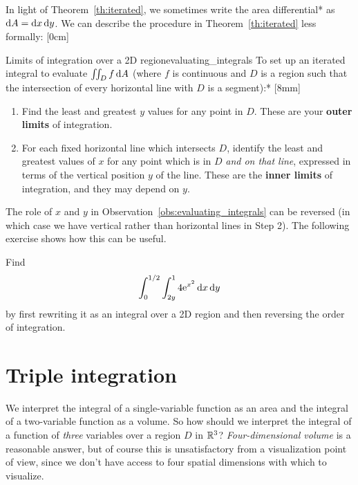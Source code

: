 \documentclass{watsonbook}
\begin{document}
In light of Theorem~\ref{th:iterated}, we sometimes write the area
differential* as $\mathrm{d} A = \mathrm{d} x \, \mathrm{d} y$. We can describe the procedure
in Theorem~\ref{th:iterated} less formally: [0cm]
\begin{obs}{Limits of integration over a 2D
    region}{evaluating_integrals}
  To set up an iterated integral to evaluate $\iint_D f \, {\mathrm{d}}A$
  (where $f$ is continuous and $D$ is a region such that the
  intersection of every horizontal line with $D$ is a segment):*
  [8mm] 
  \begin{enumerate}[leftmargin=12pt, itemsep = 6pt, topsep = 5pt]
  \item Find the least and greatest $y$ values for any point in
    $D$. These are your \textbf{outer limits} of integration. 
  \item For each fixed horizontal line which intersects $D$, identify
    the least and greatest values of $x$ for any point which is in $D$
    \textit{and on that line}, expressed in terms of the vertical
    position $y$ of the line. These are the \textbf{inner limits} of
    integration, and they may depend on $y$.
  \end{enumerate}
\end{obs}

The role of $x$ and $y$ in Observation~\ref{obs:evaluating_integrals}
can be reversed (in which case we have vertical rather than horizontal
lines in Step 2). The following exercise shows how this can be useful.

\begin{exercise}{}{}
  Find
  \[
    \int_0^{1/2} \int_{2y}^1 4 \mathrm{e}^{x^2}\, \mathrm{d} x\, \mathrm{d} y
  \]
  by first rewriting it as an integral over a 2D region and then
  reversing the order of integration.
\end{exercise}


\section{Triple integration} \label{sec:triple} 


We interpret the integral of a single-variable function as an area and
the integral of a two-variable function as a volume. So how should we
interpret the integral of a function of \textit{three} variables over
a region $D$ in $\mathbb{R}^3$?  \textit{Four-dimensional volume} is a
reasonable answer, but of course this is unsatisfactory from a
visualization point of view, since we don't have access to four
spatial dimensions with which to visualize.
\end{document}

